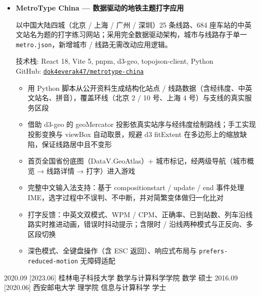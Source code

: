 \documentclass[zh]{resume}
\begin{document}
\begin{itemize}
    \vspace{0.6ex}
    {\color{accentcolor!15}\hrule}
    \vspace{0.6ex}

    \item[\faCode] \textbf{MetroType China — 数据驱动的地铁主题打字应用}

    以中国大陆四城（北京 / 上海 / 广州 / 深圳）25 条线路、684 座车站的中英文站名为题的打字练习网站；采用完全数据驱动架构，城市与线路存于单一 \texttt{metro.json}，新增城市 / 线路无需改动应用逻辑。

    技术栈: React 18, Vite 5, pnpm, d3-geo, topojson-client, Python \\
    GitHub: \href{https://github.com/dok4everak47/metrotype-china}{\texttt{dok4everak47/metrotype-china}}
    \begin{itemize}
        \item 用 Python 脚本从公开资料生成结构化站点 / 线路数据（含经纬度、中英文站名、拼音），覆盖环线（北京 2 / 10 号、上海 4 号）与支线的真实服务区段
        \item 借助 d3-geo 的 geoMercator 投影依真实站序与经纬度绘制路线；手工实现投影变换与 viewBox 自动取景，规避 d3 fitExtent 在多边形上的缩放缺陷，保证线路居中且不变形
        \item 首页全国省份底图（DataV.GeoAtlas）+ 城市标记，经两级导航（城市概览 → 线路详情 → 打字）进入游戏
        \item 完整中文输入法支持：基于 compositionstart / update / end 事件处理 IME，选字过程中不误判、不中断，并对简繁变体做归一化比对
        \item 打字反馈：中英文双模式、WPM / CPM、正确率、已到站数、列车沿线路实时推进动画，错误时抖动提示；含限时 / 沿线两种模式与正反向、多区段切换
        \item 深色模式、全键盘操作（含 ESC 返回）、响应式布局与 \texttt{prefers-reduced-motion} 无障碍适配
    \end{itemize}
\end{itemize}

\begin{educations}
  \education%
    {2020.09}%
    [2023.06]%
    {桂林电子科技大学}%
    {数学与计算科学学院}%
    {数学}%
    {硕士}
  \separator{0.5ex}
  \education%
    {2016.09}%
    [2020.06]%
    {西安邮电大学}%
    {理学院}%
    {信息与计算科学}%
    {学士}
\end{educations}
\end{document}
